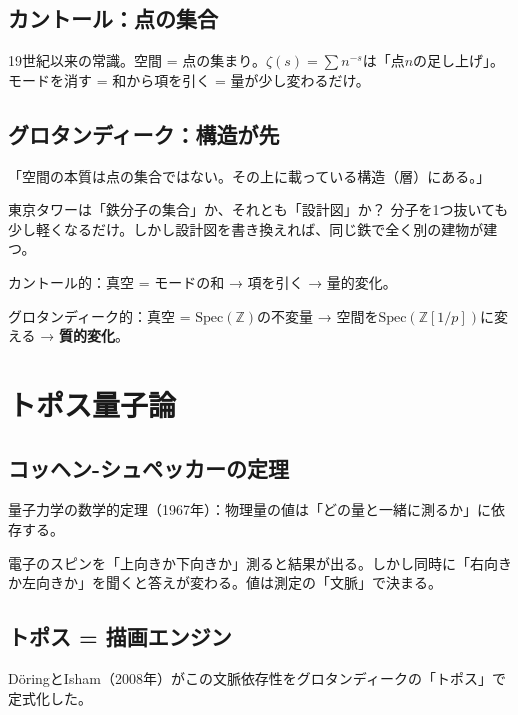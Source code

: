 \documentclass[12pt,a4paper]{article}
\newcommand{\Spec}{\mathrm{Spec}}
\newcommand{\Zp}{\mathbb{Z}[1/p]}
\begin{document}
\subsection{カントール：点の集合}

19世紀以来の常識。空間 = 点の集まり。$\zeta(s) = \sum n^{-s}$は「点$n$の足し上げ」。モードを消す = 和から項を引く = 量が少し変わるだけ。

\subsection{グロタンディーク：構造が先}

\begin{deepbox}[グロタンディーク（1928--2014）]
「空間の本質は点の集合ではない。その上に載っている構造（層）にある。」

東京タワーは「鉄分子の集合」か、それとも「設計図」か？ 分子を1つ抜いても少し軽くなるだけ。しかし設計図を書き換えれば、同じ鉄で全く別の建物が建つ。

カントール的：真空 = モードの和 → 項を引く → 量的変化。

グロタンディーク的：真空 = $\Spec(\mathbb{Z})$の不変量 → 空間を$\Spec(\Zp)$に変える → \textbf{質的変化}。
\end{deepbox}

\section{トポス量子論}

\subsection{コッヘン-シュペッカーの定理}

量子力学の数学的定理（1967年）：物理量の値は「どの量と一緒に測るか」に依存する。

電子のスピンを「上向きか下向きか」測ると結果が出る。しかし同時に「右向きか左向きか」を聞くと答えが変わる。値は測定の「文脈」で決まる。

\subsection{トポス = 描画エンジン}

DöringとIsham（2008年）がこの文脈依存性をグロタンディークの「トポス」で定式化した。
\end{document}
